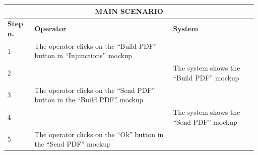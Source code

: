 {{{			\begin{table}[h]
			\begin{tabular}{|p{2cm}|p{6cm}|p{6cm}|}
			\hline
				\multicolumn{3}{|c|}{MAIN SCENARIO}\\
			\hline
				\centering \vspace{1mm} \bfseries{Step n.} \vspace{1mm} & \vspace{1mm} \bfseries{Operator} \vspace{1mm} & \vspace{1mm} \bfseries{System} \vspace{1mm}\\
			\hline
				\vspace{1mm} 1\vspace{1mm} &
				\vspace{1mm} The operator clicks on the “Build PDF” button in “Injunctions” mockup \vspace{1mm} & 
				\vspace{1mm} \vspace{1mm} \\
			\hline
				\vspace{1mm} 2\vspace{1mm} &
				\vspace{1mm} \vspace{1mm} & 
				\vspace{1mm} The system shows the “Build PDF” mockup\vspace{1mm} \\
			\hline
				\vspace{1mm} 3\vspace{1mm} &
				\vspace{1mm} The operator clicks on the “Send PDF” button in the “Build PDF” mockup \vspace{1mm} & 
				\vspace{1mm} \vspace{1mm} \\
			\hline
				\vspace{1mm} 4\vspace{1mm} &
				\vspace{1mm} \vspace{1mm} & 
				\vspace{1mm} The system shows the “Send PDF” mockup \vspace{1mm} \\
			\hline
				\vspace{1mm} 5\vspace{1mm} &
				\vspace{1mm} The operator clicks on the “Ok” button in the “Send PDF” mockup \vspace{1mm} & 

\end{tabular}
\end{table}}}}
